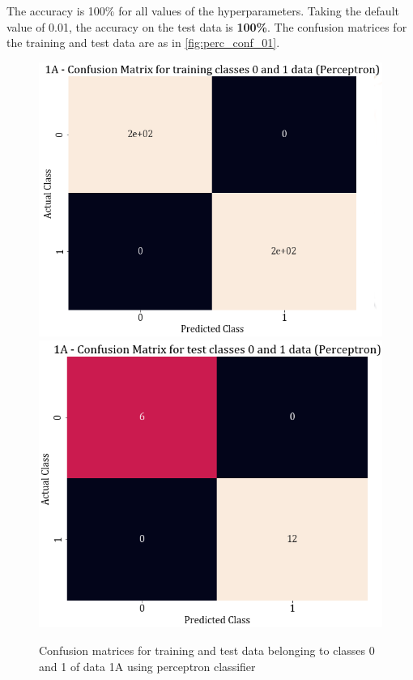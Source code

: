 \documentclass[11pt,a4paper]{article}
\newcommand{\noi}{\noindent}
\begin{document}
\noi
The accuracy is 100\% for all values of the hyperparameters. Taking the default value of 0.01, the accuracy on the test data is \textbf{100\%}. The confusion matrices for the training and test data are as in \autoref{fig:perc_conf_01}.
\begin{figure}[H]
    \centering
    \includegraphics[scale=0.35]{images/1A_perceptron_training_classes_0_and_1_confmat.png}
    \includegraphics[scale=0.35]{images/1A_perceptron_test_classes_0_and_1_confmat.png}
    \caption{Confusion matrices for training and test data belonging to classes 0 and 1 of data 1A using perceptron classifier}
    \label{fig:perc_conf_01}
\end{figure}
\end{document}

